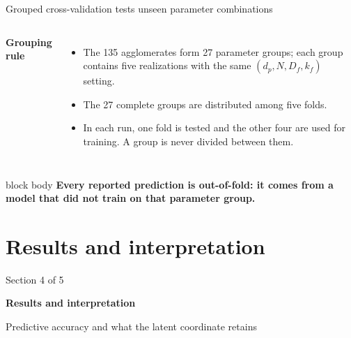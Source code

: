 \documentclass[aspectratio=169,11pt]{beamer}
\newcommand{\hi}[1]{\textcolor{tumblue}{\textbf{#1}}}
\newcommand{\takeaway}[1]{%
	\begin{beamercolorbox}[rounded=true,sep=.55em]{block body}
		\centering\color{tumdark}\textbf{#1}
\end{beamercolorbox}}
\begin{document}
\begin{frame}{Grouped cross-validation tests unseen parameter combinations}
  \begin{columns}[c,onlytextwidth]
      \hi{Grouping rule}
      \begin{itemize}
        \item The 135 agglomerates form 27 parameter groups; each group contains
          five realizations with the same $(d_p,N,D_f,k_f)$ setting.
        \item The 27 complete groups are distributed among five folds.
        \item In each run, one fold is tested and the other four are used for
          training. A group is never divided between them.
      \end{itemize}
    \centering
  \end{columns}
  \vspace{.25cm}
  \takeaway{Every reported prediction is out-of-fold: it comes from a model that did not train on that parameter group.}
\end{frame}

\section[Results]{Results and interpretation}
\begin{frame}{}
  \vfill
  {\large\color{tumgray}Section 4 of 5}\par\vspace{0.4cm}
  {\LARGE\color{tumblue}\textbf{Results and interpretation}}\par\vspace{0.5cm}
  {\large Predictive accuracy and what the latent coordinate retains}
  \vfill
\end{frame}
\end{document}
